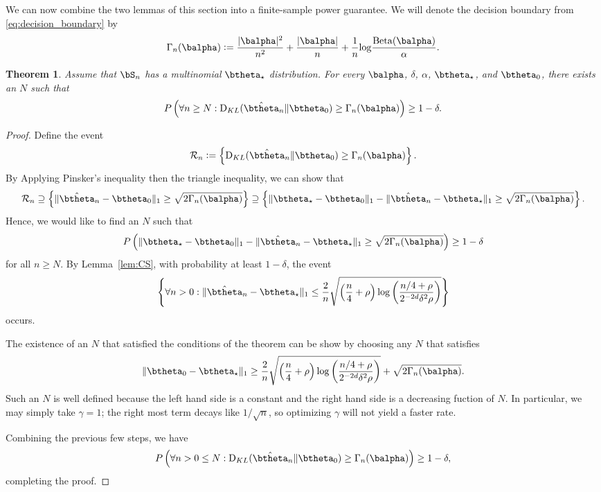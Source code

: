 \documentclass[11pt]{article}
\def\log{{\rm log}}
\newcommand{\Beta}{\mathrm{Beta}}
\newcommand{\KL}{\mathrm{D}_{KL}}
\newtheorem{thm}{Theorem}[section]
\newcommand{\df}{\vcentcolon=}
\newcommand{\pfrac}[2]{\left(\frac{#1}{#2}\right)}
\begin{document}
We can now combine the two lemmas of this section into a finite-sample power guarantee.
We will denote the decision boundary from \eqref{eq:decision_boundary} by
\[\Gamma_n(\balpha)
  \df
  \frac{|\balpha|^2}{n^2} + \frac{|\balpha|}{n}
  +
  \frac{1}{n}\log\frac{\Beta(\balpha)}{\alpha}.
\]
\begin{thm}\label{thm:power_lower_bound}
  Assume that $\bS_n$ has a multinomial $\btheta_\star$ distribution.
For every $\balpha$, $\delta$, $\alpha$, $\btheta_\star$, and $\btheta_0$, there exists an $N$ such that
  \begin{equation*}
    P\left(\forall n \geq N: \KL(\hat\btheta_n \Vert \btheta_0) \geq \Gamma_n(\balpha)\right)
    \geq 1-\delta.
  \end{equation*}
\end{thm}
\begin{proof}
  Define the event
  \[
    \mathcal R_n
    \df
    \left\{
    \KL(\hat\btheta_n \Vert \btheta_0) \geq \Gamma_n(\balpha)
  \right\}.
\]
By Applying Pinsker's inequality then the triangle inequality, we can show that
\[
  \mathcal R_n \supseteq
  \left\{
    \Vert \hat\btheta_n - \btheta_0\Vert_1 \geq \sqrt{2\Gamma_n(\balpha)}
  \right\}
  \supseteq
    \left\{
      \Vert \btheta_\star - \btheta_0\Vert_1
      -
      \Vert \hat\btheta_n - \btheta_\star\Vert_1
      \geq \sqrt{2\Gamma_n(\balpha)}
  \right\}.
\]
Hence, we would like to find an $N$ such that
\[
      P\left(
      \Vert \btheta_\star - \btheta_0\Vert_1
      -
      \Vert \hat\btheta_n - \btheta_\star\Vert_1
      \geq \sqrt{2\Gamma_n(\balpha)}
  \right)\geq 1-\delta
\]
for all $n\geq N$.
By Lemma~\ref{lem:CS}, with probability at least $1-\delta$, the event
\begin{align*}
  \left\{ \forall n > 0:
  \Vert\hat\btheta_n- \btheta_\star\Vert_1
  \leq
    \frac{2}{n}\sqrt{\left(\frac{n}{4} + \rho\right)\log\pfrac{n/4+\rho}{2^{-2d}\delta^2 \rho}}\right\}
\end{align*}
occurs.

The existence of an $N$ that satisfied the conditions of the theorem can be show by choosing any $N$ that satisfies
\[
  \Vert \btheta_0- \btheta_\star\Vert_{1}
    \geq
        \frac{2}{n}\sqrt{\left(\frac{n}{4} + \rho\right)\log\pfrac{n/4+\rho}{2^{-2d}\delta^2 \rho}}
    + \sqrt{2\Gamma_n(\balpha)}.
  \]
Such an $N$ is well defined because the left hand side is a constant and the right hand side is a decreasing fuction of $N$.
In particular, we may simply take $\gamma = 1$; the right most term decays like $1/\sqrt{n}$, so optimizing $\gamma$ will not yield a faster rate.



Combining the previous few steps, we have
\begin{equation*}
    P\left(\forall n>0 \leq N: \KL(\hat\btheta_n \Vert \btheta_0) \geq \Gamma_n(\balpha)\right)
    \geq 1-\delta,
  \end{equation*}
  completing the proof.
\end{proof}
\end{document}
